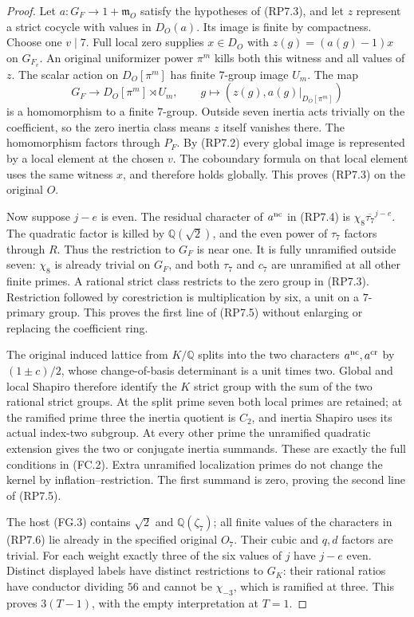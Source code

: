 \begin{proof}
Let $a:G_F\to1+\mathfrak m_O$ satisfy the hypotheses of
(RP7.3), and let $z$ represent a strict cocycle with values
in $D_O(a)$. Its image is finite by compactness. Choose
one $v\mid7$. Full local zero supplies $x\in D_O$ with
$z(g)=(a(g)-1)x$ on $G_{F_v}$.
An original uniformizer power $\pi^m$ kills both this witness
and all values of $z$. The scalar action on $D_O[\pi^m]$
has finite $7$-group image $U_m$. The map
\[
 G_F\longrightarrow D_O[\pi^m]\rtimes U_m,
 \qquad g\longmapsto(z(g),a(g)|_{D_O[\pi^m]})
 \tag{RP7.19}
\]
is a homomorphism to a finite $7$-group. Outside seven inertia
acts trivially on the coefficient, so the zero inertia class
means $z$ itself vanishes there. The homomorphism factors
through $P_F$. By (RP7.2) every global image is represented
by a local element at the chosen $v$. The coboundary formula
on that local element uses the same witness $x$, and therefore
holds globally. This proves (RP7.3) on the original $O$.

Now suppose $j-e$ is even. The residual character of
$a^{\rm nc}$ in (RP7.4) is
$\chi_8\overline{\tau_7}^{j-e}$.
The quadratic factor is killed by $\mathbb Q(\sqrt2)$,
and the even power of $\tau_7$ factors through $R$.
Thus the restriction to $G_F$ is near one. It is fully
unramified outside seven: $\chi_8$ is already trivial
on $G_F$, and both $\tau_7$ and $c_7$ are unramified
at all other finite primes. A rational strict class
restricts to the zero group in (RP7.3). Restriction followed
by corestriction is multiplication by six, a unit on a
$7$-primary group. This proves the first line of (RP7.5)
without enlarging or replacing the coefficient ring.

The original induced lattice from $K/\mathbb Q$ splits into
the two characters $a^{\rm nc},a^{\rm cr}$ by
$(1\pm c)/2$, whose change-of-basis determinant is a unit
times two. Global and local Shapiro therefore identify the
$K$ strict group with the sum of the two rational strict
groups. At the split prime seven both local primes are retained;
at the ramified prime three the inertia quotient is $C_2$,
and inertia Shapiro uses its actual index-two subgroup.
At every other prime the unramified quadratic extension gives
the two or conjugate inertia summands. These are exactly
the full conditions in (FC.2). Extra unramified localization
primes do not change the kernel by inflation--restriction.
The first summand is zero, proving the second line of (RP7.5).

The host (FG.3) contains $\sqrt2$ and $\mathbb Q(\zeta_7)$;
all finite values of the characters in (RP7.6) lie already
in the specified original $O_7$. Their cubic and $q,d$
factors are trivial. For each weight exactly three of the
six values of $j$ have $j-e$ even. Distinct displayed labels
have distinct restrictions to $G_K$: their rational ratios
have conductor dividing $56$ and cannot be $\chi_{-3}$,
which is ramified at three. This proves $3(T-1)$, with
the empty interpretation at $T=1$.


\end{proof}
